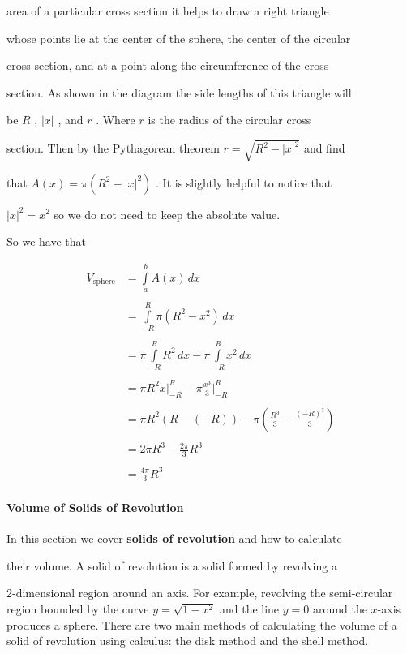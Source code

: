 area of a particular cross section it helps to draw a right triangle

whose points lie at the center of the sphere, the center of the circular

cross section, and at a point along the circumference of the cross

section. As shown in the diagram the side lengths of this triangle will

be $R$ , $|x|$ , and $r$ . Where $r$ is the radius of the circular cross

section. Then by the Pythagorean theorem $r=\sqrt{R^2-|x|^2}$ and find

that $A(x)=\pi(R^2-|x|^2)$ . It is slightly helpful to notice that

$|x|^2=x^2$ so we do not need to keep the absolute value.



So we have that



\begin{align} V _{\text{sphere}} &= \int\limits _a^b A(x)\,dx \\\\ &= \int\limits _{-R}^R \pi(R^2-x^2)\,dx \\\\ &= \pi \int\limits _{-R}^R R^2\,dx - \pi \int\limits _{-R}^R x^2\,dx \\\\ &= \pi R^2 x \Bigg| _{-R}^R - \pi \frac{x^3}{3} \Bigg| _{-R}^R \\\\ &= \pi R^2 \left(R - (-R)\right) - \pi \left(\frac{R^3}{3} - \frac{(-R)^3}{3}\right) \\\\ &= 2\pi R^3 - \frac{2\pi}{3} R^3 \\\\ &= \frac{4\pi}{3} R^3 \end{align} 



\paragraph{Volume of Solids of Revolution}



In this section we cover \textbf{solids of revolution} and how to calculate

their volume. A solid of revolution is a solid formed by revolving a

2-dimensional region around an axis. For example, revolving the semi-circular region bounded by the curve $y=\sqrt{1-x^2}$ and the line $y=0$ around the $x$-axis produces a sphere. There are two main methods of calculating the volume of a solid of revolution using calculus: the disk method and the shell method.




